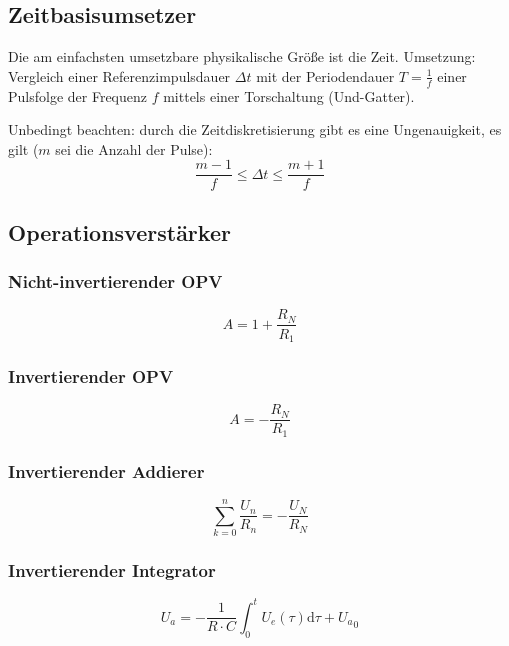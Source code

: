 \subsection{Zeitbasisumsetzer}
Die am einfachsten umsetzbare physikalische Größe ist die Zeit. 
Umsetzung: Vergleich einer Referenzimpulsdauer $\Delta t$ mit der Periodendauer $T = \frac{1}{f}$ einer Pulsfolge der Frequenz $f$ mittels einer Torschaltung
(Und-Gatter).

Unbedingt beachten: durch die Zeitdiskretisierung gibt es eine Ungenauigkeit, es gilt ($m$ sei die Anzahl der Pulse):
\begin{equation*}
    \frac{m-1}{f} \leq \Delta t \leq \frac{m+1}{f}
\end{equation*}

\subsection{Operationsverstärker}

\subsubsection{Nicht-invertierender OPV}
\begin{equation*}
    A = 1 + \frac{R_N}{R_1}
\end{equation*}

\subsubsection{Invertierender OPV}
\begin{equation*}
    A = - \frac{R_N}{R_1}
\end{equation*}

\subsubsection{Invertierender Addierer}
\begin{equation*}
    \sum_{k=0}^n \frac{U_n}{R_n} = - \frac{U_N}{R_N}
\end{equation*}

\subsubsection{Invertierender Integrator}
\begin{equation*}
    U_a = -\frac{1}{R\cdot C} \int_0^t U_e(\tau) \text{d}\tau + {U_a}_0
\end{equation*}

